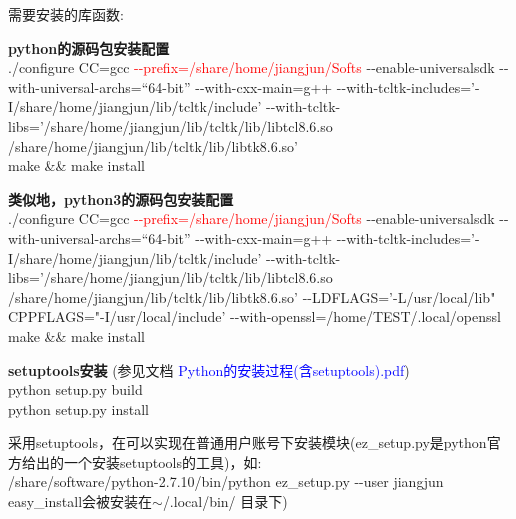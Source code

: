 \documentclass[10pt,a4paper]{article}
\begin{document}
需要安装的库函数:\\
\vskip 5pt

\textbf{python的源码包安装配置}\\
./configure CC=gcc \textcolor{red}{-\/-prefix=/share/home/jiangjun/Softs}  -\/-enable-universalsdk -\/-with-universal-archs=``64-bit''  -\/-with-cxx-main=g++ -\/-with-tcltk-includes='-I/share/home/jiangjun/lib/tcltk/include' -\/-with-tcltk-libs='/share/home/jiangjun/lib/tcltk/lib/libtcl8.6.so /share/home/jiangjun/lib/tcltk/lib/libtk8.6.so'\\
make \&\& make install

\textbf{类似地，python3的源码包安装配置}\\
./configure CC=gcc \textcolor{red}{-\/-prefix=/share/home/jiangjun/Softs}  -\/-enable-universalsdk -\/-with-universal-archs=``64-bit''  -\/-with-cxx-main=g++ -\/-with-tcltk-includes='-I/share/home/jiangjun/lib/tcltk/include' -\/-with-tcltk-libs='/share/home/jiangjun/lib/tcltk/lib/libtcl8.6.so /share/home/jiangjun/lib/tcltk/lib/libtk8.6.so' -\/-LDFLAGS='-L/usr/local/lib" CPPFLAGS="-I/usr/local/include' -\/-with-openssl=/home/TEST/.local/openssl \\
make \&\& make install

\textbf{setuptools安装} (参见文档 \textcolor{blue}{\textrm{Python}的安装过程(含\textrm{setuptools}).pdf})\\
python setup.py build\\
python setup.py install


采用\textrm{setuptools}，在可以实现在普通用户账号下安装模块(\textrm{ez\_setup.py}是\textrm{python}官方给出的一个安装\textrm{setuptools}的工具)，如:\\
/share/software/python-2.7.10/bin/python ez\_setup.py -\/-user jiangjun\\
\textrm{easy\_install}会被安装在$\sim$/.local/bin/ 目录下)\\\\
\end{document}
